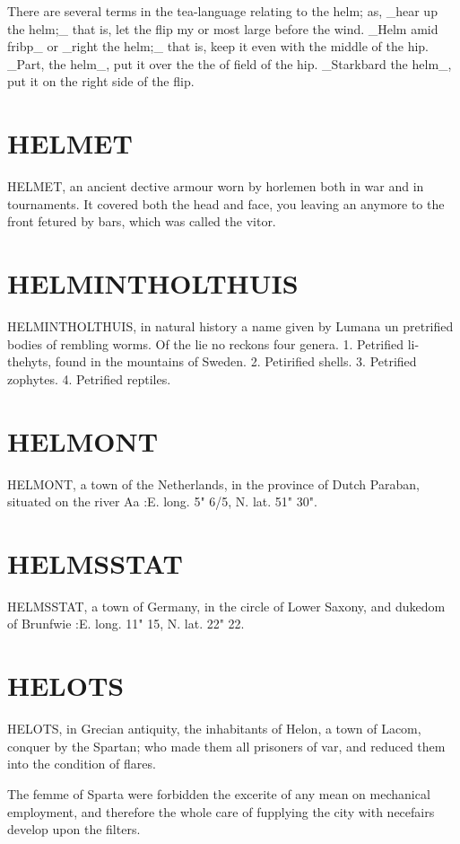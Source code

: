\documentclass{article}
\begin{document}
There are several terms in the tea-language relating to the helm; as, \_hear up the helm;\_ that is, let the flip my or most large before the wind. \_Helm amid fribp\_ or \_right the helm;\_ that is, keep it even with the middle of the hip. \_Part, the helm\_, put it over the the of field of the hip. \_Starkbard the helm\_, put it on the right side of the flip.

\section*{HELMET}
HELMET, an ancient dective armour worn by horlemen both in war and in tournaments. It covered both the head and face, you leaving an anymore to the front fetured by bars, which was called the vitor.

\section*{HELMINTHOLTHUIS}
HELMINTHOLTHUIS, in natural history a name given by Lumana un pretrified bodies of rembling worms. Of the lie no reckons four genera. 1. Petrified li- thehyts, found in the mountains of Sweden. 2. Petirified shells. 3. Petrified zophytes. 4. Petrified reptiles.

\section*{HELMONT}
HELMONT, a town of the Netherlands, in the province of Dutch Paraban, situated on the river Aa :E. long. 5" 6/5, N. lat. 51" 30".

\section*{HELMSSTAT}
HELMSSTAT, a town of Germany, in the circle of Lower Saxony, and dukedom of Brunfwie :E. long. 11" 15, N. lat. 22" 22.

\section*{HELOTS}
HELOTS, in Grecian antiquity, the inhabitants of Helon, a town of Lacom, conquer by the Spartan; who made them all prisoners of var, and reduced them into the condition of flares.

The femme of Sparta were forbidden the excerite of any mean on mechanical employment, and therefore the whole care of fupplying the city with necefairs develop upon the filters.
\end{document}
